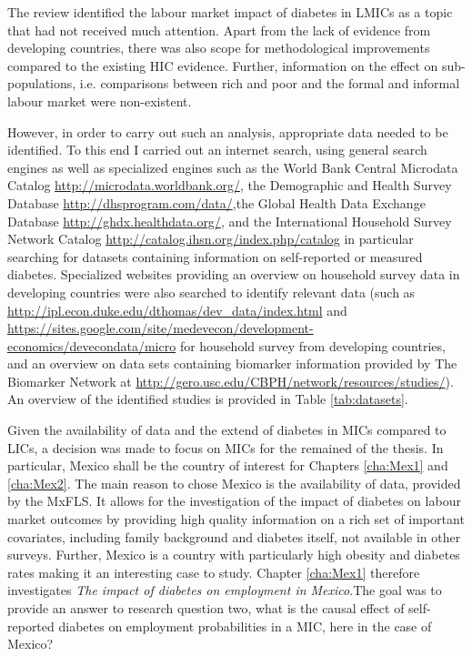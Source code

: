 The review identified the labour market impact of diabetes in \acp{LMIC} as a topic that had not received much attention. Apart from the lack of evidence from developing countries, there was also scope for methodological improvements compared to the existing \ac{HIC} evidence. Further, information on the effect on sub-populations, i.e. comparisons between rich and poor and the formal and informal labour market were non-existent.

However, in order to carry out such an analysis, appropriate data needed to be identified. To this end I carried out an internet search, using general search engines as well as specialized engines such as the World Bank Central Microdata Catalog  \url{http://microdata.worldbank.org/}, the Demographic and Health Survey Database \url{http://dhsprogram.com/data/},the Global Health Data Exchange Database \url{http://ghdx.healthdata.org/}, and the International Household Survey Network Catalog \url{http://catalog.ihsn.org/index.php/catalog} in particular searching for datasets containing information on self-reported or measured diabetes. Specialized websites providing an overview on household survey data in developing countries were also searched to identify relevant data (such as \url{http://ipl.econ.duke.edu/dthomas/dev_data/index.html} and \url{https://sites.google.com/site/medevecon/development-economics/devecondata/micro} for household survey from developing countries, and an overview on data sets containing biomarker information provided by The Biomarker Network at \url{http://gero.usc.edu/CBPH/network/resources/studies/}). An overview of the identified studies is provided in Table \ref{tab:datasets}.

Given the availability of data and the extend of diabetes in \acp{MIC} compared to \acp{LIC}, a decision was made to focus on \acp{MIC} for the remained of the thesis. In particular, Mexico shall be the country of interest for Chapters \ref{cha:Mex1} and \ref{cha:Mex2}. The main reason to chose Mexico is the availability of data, provided by the \ac{MxFLS}. It allows for the investigation of the impact of diabetes on labour market outcomes by providing high quality information on a rich set of important covariates, including family background and diabetes itself, not available in other surveys. Further, Mexico is a country with particularly high obesity and diabetes rates making it an interesting case to study. Chapter \ref{cha:Mex1} therefore investigates \textit{The impact of diabetes on employment in Mexico}.The goal was to provide an answer to research question two, what is the causal effect of self-reported diabetes on employment probabilities in a \ac{MIC}, here in the case of Mexico?

